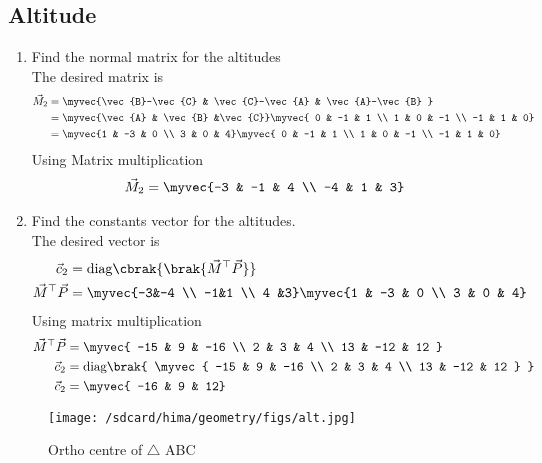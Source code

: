 \documentclass[11pt]{book}
\begin{document}
\subsection{Altitude}

  
\begin{enumerate}[label=\thesubsection.\arabic*.,ref=\thesubsection.\theenumi]
\item Find the normal matrix for the altitudes \\
\solution  The desired matrix is 
\begin{align}
\vec{M}_2 &= \myvec{\vec{B}-\vec{C} & \vec{C}-\vec{A} & \vec{A}-\vec{B} }
\\
&= 
\myvec{\vec{A} & \vec{B} &\vec{C}}
\myvec{ 0 & -1 & 1 \\ 1 & 0 & -1 \\ -1 & 1 & 0} \\
&= 
\myvec{1 & -3 & 0 \\ 3 & 0 & 4}
\myvec{ 0 & -1 & 1 \\ 1 & 0 & -1 \\ -1 & 1 & 0}
\end{align}
Using Matrix multiplication 
\begin{align}
   \vec{M}_2 &=\myvec{-3 & -1 & 4 \\ -4 & 1 & 3}
\end{align}
\item Find the constants vector for the altitudes. \\
\solution The desired vector is 
\begin{align}
\vec{c}_2 &= \text{diag}\cbrak{\brak{\vec{M}^{\top}\vec{P}}} \\
\vec{M}^{\top}\vec{P} &= \myvec{-3&-4 \\ -1&1 \\ 4 &3}\myvec{1 & -3 & 0 \\ 3 & 0 & 4} \\
\end{align}
Using matrix multiplication
\begin{align}
 \vec{M}^{\top}\vec{P}    &=\myvec{ -15 & 9 & -16 \\ 2 & 3 & 4 \\ 13 & -12 & 12 } \\
    \vec{c}_2 &= \text{diag}\brak{ \myvec{ -15 & 9 & -16 \\ 2 & 3 & 4 \\ 13 & -12 & 12 } } \\
 \vec{c}_2   &= \myvec{ -16 & 9 & 12}
\end{align}
\end{enumerate}
\begin{figure}[H]
    \centering
    \texttt{[image: /sdcard/hima/geometry/figs/alt.jpg]}
    \caption{Ortho centre of $\triangle$ ABC}
    \label{fig:mat_alt1}
\end{figure}
\end{document}
